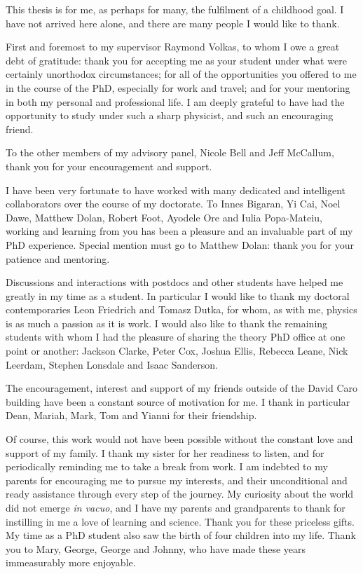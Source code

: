 \begin{acknowledgements}
  This thesis is for me, as perhaps for many, the fulfilment of a childhood
  goal. I have not arrived here alone, and there are many people I would like to
  thank.

  First and foremost to my supervisor Raymond Volkas, to whom I owe a great debt
  of gratitude: thank you for accepting me as your student under what were
  certainly unorthodox circumstances; for all of the opportunities you offered
  to me in the course of the PhD, especially for work and travel; and for your
  mentoring in both my personal and professional life. I am deeply grateful to
  have had the opportunity to study under such a sharp physicist, and such an
  encouraging friend.

  To the other members of my advisory panel, Nicole Bell and Jeff McCallum,
  thank you for your encouragement and support.

  I have been very fortunate to have worked with many dedicated and intelligent
  collaborators over the course of my doctorate. To Innes Bigaran, Yi Cai, Noel
  Dawe, Matthew Dolan, Robert Foot, Ayodele Ore and Iulia Popa-Mateiu, working and learning
  from you has been a pleasure and an invaluable part of my PhD experience.
  Special mention must go to Matthew Dolan: thank you for your patience and
  mentoring.

  Discussions and interactions with postdocs and other students have helped me
  greatly in my time as a student. In particular I would like to thank my
  doctoral contemporaries Leon Friedrich and Tomasz Dutka, for whom, as with me,
  physics is as much a passion as it is work. I would also like to thank the
  remaining students with whom I had the pleasure of sharing the theory PhD
  office at one point or another: Jackson Clarke, Peter Cox, Joshua Ellis,
  Rebecca Leane, Nick Leerdam, Stephen Lonsdale and Isaac Sanderson.

  The encouragement, interest and support of my friends outside of the David
  Caro building have been a constant source of motivation for me. I thank in
  particular Dean, Mariah, Mark, Tom and Yianni for their friendship.

  Of course, this work would not have been possible without the constant love
  and support of my family. I thank my sister for her readiness to listen, and for periodically reminding me to take a break from work.  I am indebted to my parents for encouraging me to pursue my interests, and their unconditional and ready
  assistance through every step of the journey. My curiosity about the world did
  not emerge \textit{in vacuo}, and I have my parents and grandparents to thank
  for instilling in me a love of learning and science. Thank you for these
  priceless gifts. My time as a PhD student also saw the birth of four children into my life. Thank you to Mary, George, George and Johnny, who have made these years immeasurably more enjoyable.


\end{acknowledgements}
